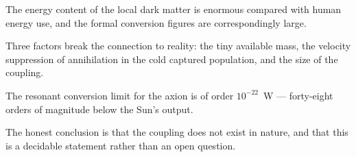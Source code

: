 \begin{keytakeaways}
\item The energy content of the local dark matter is enormous compared with
human energy use, and the formal conversion figures are correspondingly
large.
\item Three factors break the connection to reality: the tiny available mass,
the velocity suppression of annihilation in the cold captured population,
and the size of the coupling.
\item The resonant conversion limit for the axion is of order
$10^{-22}$~W --- forty-eight orders of magnitude below the Sun's output.
\item The honest conclusion is that the coupling does not exist in nature, and
that this is a decidable statement rather than an open question.
\end{keytakeaways}
